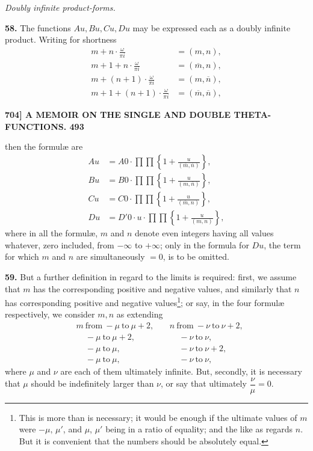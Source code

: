 \documentclass[11pt]{article}
\begin{document}
\medskip
\begin{center}\textit{Doubly infinite product-forms.}\end{center}

\textbf{58.} The functions $Au, Bu, Cu, Du$ may be expressed each as a doubly infinite product. Writing for shortness
\[
\begin{aligned}
m + n\cdot\frac{\omega}{\pi i} &= (m,n),\\
m + 1 + n\cdot\frac{\omega}{\pi i} &= (\overline{m},n),\\
m + (n+1)\cdot\frac{\omega}{\pi i} &= (m,\overline{n}),\\
m + 1 + (n+1)\cdot\frac{\omega}{\pi i} &= (\overline{m},\overline{n}),
\end{aligned}
\]

\bigskip
\noindent\textbf{704] \hfill A MEMOIR ON THE SINGLE AND DOUBLE THETA-FUNCTIONS. \hfill 493}

\medskip
then the formul\ae{} are
\[
\begin{aligned}
Au &= A0\cdot \prod\prod\!\left\{1 + \frac{u}{(\overline{m},\overline{n})}\right\},\\
Bu &= B0\cdot \prod\prod\!\left\{1 + \frac{u}{(m,\overline{n})}\right\},\\
Cu &= C0\cdot \prod\prod\!\left\{1 + \frac{u}{(\overline{m},n)}\right\},\\
Du &= D'0\cdot u\cdot \prod\prod\!\left\{1 + \frac{u}{(m,n)}\right\},
\end{aligned}
\]
where in all the formul\ae, $m$ and $n$ denote even integers having all values whatever, zero included, from $-\infty$ to $+\infty$; only in the formula for $Du$, the term for which $m$ and $n$ are simultaneously $=0$, is to be omitted.

\medskip
\textbf{59.} But a further definition in regard to the limits is required: first, we assume that $m$ has the corresponding positive and negative values, and similarly that $n$ has corresponding positive and negative values\footnote{This is more than is necessary; it would be enough if the ultimate values of $m$ were $-\mu,\,\mu'$, and $\mu$, $\mu'$ being in a ratio of equality; and the like as regards $n$. But it is convenient that the numbers should be absolutely equal.}; or say, in the four formul\ae{} respectively, we consider $m,n$ as extending
\[
\begin{aligned}
&m\ \text{from}\ -\mu\ \text{to}\ \mu+2,&\ &n\ \text{from}\ -\nu\ \text{to}\ \nu+2,\\
&\ \ \ \ \ -\mu\ \text{to}\ \mu+2,&\ &\ \ \ \ \ -\nu\ \text{to}\ \nu,\\
&\ \ \ \ \ -\mu\ \text{to}\ \mu,&\ &\ \ \ \ \ -\nu\ \text{to}\ \nu+2,\\
&\ \ \ \ \ -\mu\ \text{to}\ \mu,&\ &\ \ \ \ \ -\nu\ \text{to}\ \nu,
\end{aligned}
\]
where $\mu$ and $\nu$ are each of them ultimately infinite. But, secondly, it is necessary that $\mu$ should be indefinitely larger than $\nu$, or say that ultimately $\dfrac{\nu}{\mu}=0$.
\end{document}
